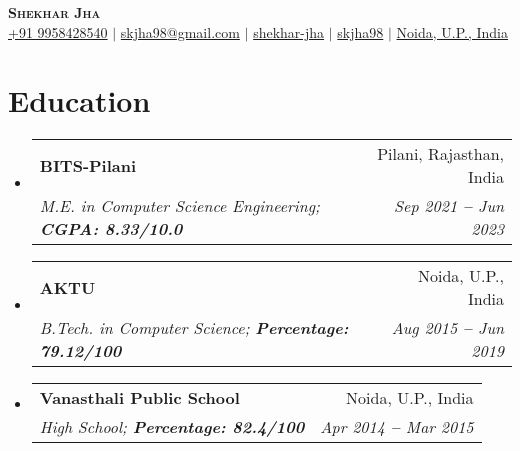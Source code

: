 \documentclass[letterpaper,11pt]{article}
\makeatletter
\newcommand{\resumeSubheading}[4]{
  \vspace{-2pt}\item
    \begin{tabular*}{0.97\textwidth}[t]{l@{\extracolsep{\fill}}r}
      \textbf{#1} & #2 \\
      \textit{\small#3} & \textit{\small #4} \\
    \end{tabular*}\vspace{-7pt}
}
\newcommand{\resumeEducationHeading}[4]{
  \vspace{-2pt}\item
    \begin{tabular*}{0.97\textwidth}[t]{l@{\extracolsep{\fill}}r}
      \textbf{#1} & #2 \\
      \textit{\small#3} & \textit{\small #4} \\
    \end{tabular*}\vspace{-5pt}
}
\newcommand{\resumeSubHeadingListStart}{\begin{itemize}[leftmargin=0.15in, label={}]}
\newcommand{\resumeSubHeadingListEnd}{\end{itemize}}
\makeatother
\begin{document}

\begin{center}
    \textbf{\Huge \scshape Shekhar Jha} \\ \vspace{3pt}
    \small
    \faMobile \hspace{.5pt} \href{tel:919958428540}{+91 9958428540}
    $|$
    \faAt \hspace{.5pt} \href{mailto:skjha98@gmail.com}{skjha98@gmail.com}
    $|$
    \faLinkedinSquare \hspace{.5pt} \href{https://www.linkedin.com/in/shekhar-jha/}{shekhar-jha}
    $|$
    \faGithub \hspace{.5pt} \href{https://github.com/skjha98}{skjha98}
    $|$
    \faMapMarker \hspace{.5pt} \href{https://www.google.com/maps/place/Noida,+Uttar+Pradesh/@28.5222018,77.4018255,12z/data=!3m1!4b1!4m6!3m5!1s0x390ce5a43173357b:0x37ffce30c87cc03f!8m2!3d28.5355161!4d77.3910265!16zL20vMDN3dHow?entry=ttu}{Noida, U.P., India}
\end{center}




\section{Education}
  \vspace{3pt}
  \resumeSubHeadingListStart
    
    \resumeEducationHeading
      {BITS-Pilani}{Pilani, Rajasthan, India}
      {M.E. in Computer Science Engineering;   \textbf{CGPA: 8.33/10.0}}{Sep 2021 \textbf{--} Jun 2023}
    
    \resumeSubheading
      {AKTU}{Noida, U.P., India}
      {B.Tech. in Computer Science;   \textbf{Percentage: 79.12/100}}{Aug 2015 \textbf{--} Jun 2019}
    \resumeSubheading
      {Vanasthali Public School}{Noida, U.P., India}
      {High School;   \textbf{Percentage: 82.4/100}}{Apr 2014 \textbf{--} Mar 2015}
    
  \resumeSubHeadingListEnd




  
\end{document}
